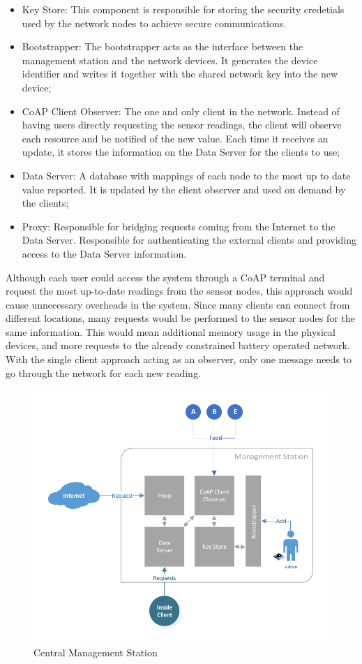 \documentclass{sig-alternate-05-2015}
\begin{document}
\begin{itemize}
	\item Key Store: This component is responsible for storing the security credetials used by the network nodes to achieve secure communications.
	\item Bootstrapper: The bootstrapper acts as the interface between the management station and the network devices. 
	It generates the device identifier and writes it together with the shared network key into the new device;
	\item CoAP Client Observer:  The one and only client in the network. 
	Instead of having users directly requesting the sensor readings, the client will observe each resource and be notified of the new value. 
	Each time it receives an update, it stores the information on the Data Server for the clients to use;
	\item Data Server: A database with mappings of each node to the most up to date value reported. 
	It is updated by the client observer and used on demand by the clients;
	\item Proxy: Responsible for bridging requests coming from the Internet to the Data Server. 
	Responsible for authenticating the external clients and providing access to the Data Server information.
\end{itemize}

Although each user could access the system through a \gls{CoAP} terminal and request the most up-to-date readings from the sensor nodes, this approach would cause unnecessary overheads in the system. 
Since many clients can connect from different locations, many requests would be performed to the sensor nodes for the same information. This would mean additional memory usage in the physical devices, and more requests to the already constrained battery operated network. 
With the single client approach acting as an observer, only one message needs to go through the network for each new reading.

\begin{figure}[h]
  \centering
  \includegraphics[width=1.05\linewidth]{figures/White_Box_Model.pdf}
  \caption{Central Management Station}
  \label{fig:core_components}
\end{figure}
\end{document}
